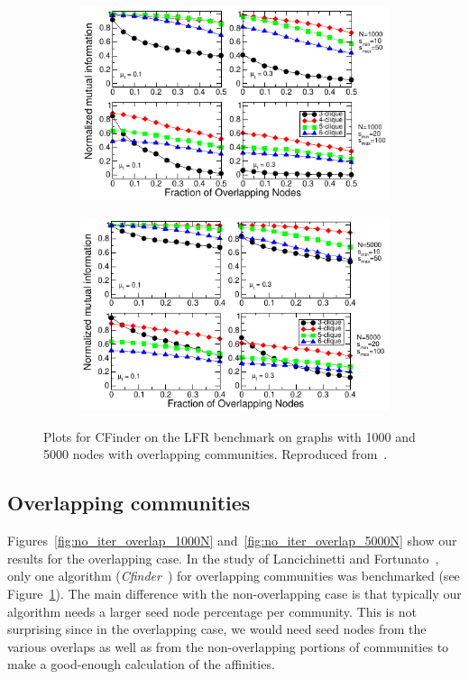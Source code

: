\begin{figure}[h!]
    \centering
    \begin{subfigure}{0.5\textwidth}
    \centering
    \includegraphics[width=\cfinderwidth]{lfrpaper/fig6.pdf}
    \end{subfigure}%
    \begin{subfigure}{0.5\textwidth}
    \centering
    \includegraphics[width=\cfinderwidth]{lfrpaper/fig7.pdf}
    \end{subfigure}%
    \caption{
        Plots for CFinder on the LFR benchmark on graphs with 1000 and 5000 nodes 
		with overlapping communities. Reproduced from~\cite{LF09}.
    }\label{fig:CFinder_overlapping}
\end{figure}



\subsection{Overlapping communities}
Figures~\ref{fig:no_iter_overlap_1000N} and~\ref{fig:no_iter_overlap_5000N} 
show our results for the overlapping case. In the study of Lancichinetti and Fortunato~\cite{LF09}, 
only one algorithm (\emph{Cfinder}~\cite{PDFV05}) for overlapping communities was benchmarked 
(see Figure~\ref{fig:CFinder_overlapping}). 
The main difference with the non-overlapping case is that typically our algorithm needs a larger 
seed node percentage per community. This is not surprising since in the overlapping case, we would 
need seed nodes from the various overlaps as well as from the non-overlapping portions of communities 
to make a good-enough calculation of the affinities. 

